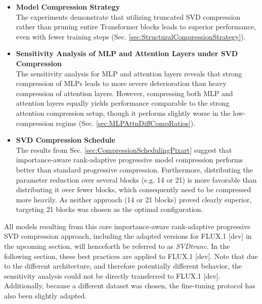 \begin{itemize}
 	\item \textbf{Model Compression Strategy} \\
 	The experiments demonstrate that utilizing truncated \gls{SVD} compression rather than pruning entire Transformer blocks leads to superior performance, even with fewer training steps (Sec. \ref{sec:StructuralCompressionStrategy}).
 	
 	\item \textbf{Sensitivity Analysis of MLP and Attention Layers under \gls{SVD} Compression} \\
 	The sensitivity analysis for \gls{MLP} and attention layers reveals that strong compression of \gls{MLP}s leads to more severe deterioration than heavy compression of attention layers. However, compressing both \gls{MLP} and attention layers equally yields performance comparable to the strong attention compression setup, though it performs slightly worse in the low-compression regime (Sec. \ref{sec:MLPAttnDiffCompRatios}).
 	
 	\item \textbf{\gls{SVD} Compression Schedule} \\
 	The results from Sec. \ref{sec:CompressionSchedulingPixart} suggest that importance-aware rank-adaptive progressive model compression performs better than standard progressive compression. Furthermore, distributing the parameter reduction over several blocks (e.g. 14 or 21) is more favorable than distributing it over fewer blocks, which consequently need to be compressed more heavily. As neither approach (14 or 21 blocks) proved clearly superior, targeting 21 blocks was chosen as the optimal configuration. 
 	
 \end{itemize}
All models resulting from this core importance-aware rank-adaptive progressive \gls{SVD} compression approach, including the adapted versions for FLUX.1 {[dev]} in the upcoming section, will henceforth be referred to as \textit{SVDtrunc}.
In the following section, these best practices are applied to FLUX.1 {[dev]}. Note that due to the different architecture, and therefore potentially different behavior, the sensitivity analysis could not be directly transferred to FLUX.1 {[dev]}. Additionally, because a different dataset was chosen, the fine-tuning protocol has also been slightly adapted.